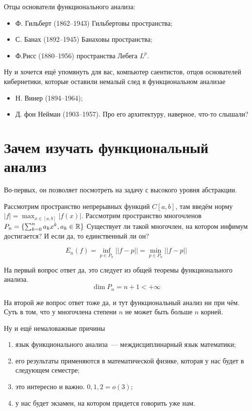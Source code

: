 \documentclass[document]{subfiles}
\begin{document}
Отцы основатели функционального анализа:
\begin{itemize}
    \item Ф. Гильберт (1862--1943) Гильбертовы пространства;
    \item С. Банах (1892--1945) Банаховы пространства;
    \item Ф.Рисс (1880--1956) пространства Лебега $L^p$.
\end{itemize}
Ну и хочется ещё упомянуть для вас, компьютер саентистов, отцов основателей кибернетики, которые оставили немалый след в функциональном анализае
\begin{itemize}
    \item Н. Винер (1894--1964);
    \item Д. фон Нейман (1903--1957). Про его архитектуру, наверное, что-то слышали?
\end{itemize}

\section{Зачем изучать функциональный анализ}
Во-первых, он позволяет посмотреть на задачу с высокого уровня абстракции.

Рассмотрим пространство непрерывных функций $C[a,b]$, там введём норму $|f| = \max_{x \in [a,b]} | f(x)|.$ Рассмотрим пространство многочленов $P_n = \{ \sum^n_{k=0} a_kx^k, a_k \in \mathbb{R} \}$
Существует ли такой многочлен, на котором инфимум достигается? И если да, то единственный ли он? 

\[ E_n (f) = \inf_{p \in P_n} || f - p||  = \min_{p \in P_n} ||f - p|| \]


На первый вопрос ответ да, это следует из общей теоремы функционального анализа. 
\[ \dim P_n = n + 1 < + \infty \]

На второй же вопрос ответ тоже да, и тут функциональный анализ ни при чём. Суть в том, что у многочлена степени $n$ не может быть больше $n$ корней.

Ну и ещё немаловажные причины
\begin{enumerate}
    \item язык функционального анализа~--- междисциплинарный язык математики;
    \item его результаты применяются в математической физике, которая у нас будет в следующем семестре;
    \item это интересно и важно.  $0,1,2 = o(3)$;
    \item у нас будет экзамен, на котором придется говорить уже нам.
\end{enumerate}
\end{document}
